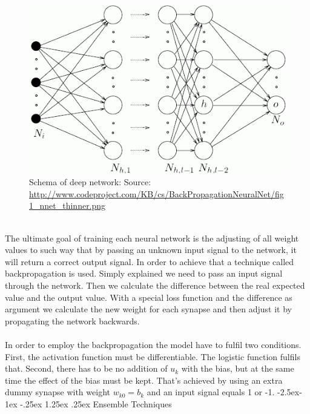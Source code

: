\documentclass[runningheads,a4paper]{llncs}[2015/06/24]
\makeatletter
\renewcommand\paragraph{\@startsection{paragraph}{4}{\z@}%
            {-2.5ex\@plus -1ex \@minus -.25ex}%
            {1.25ex \@plus .25ex}%
            {\normalfont\normalsize\bfseries}}
\makeatother
\begin{document}
\begin{figure}[h]
\centering
\includegraphics[width=\textwidth]{deepNetwork}
\caption{Schema of deep network: Source: \url{http://www.codeproject.com/KB/cs/BackPropagationNeuralNet/fig1_nnet_thinner.png}}
\label{fig:deepNetwork}
\end{figure}  
  
\hspace{1cm}\\ The ultimate goal of training each neural network is the adjusting of all weight values to such way that by passing an unknown input signal to the network, it will return a correct output signal. In order to achieve that a technique called backpropagation is used. Simply explained we need to pass an input signal through the network. Then we calculate the difference between the real expected value and the output value. With a special loss function and the difference as argument we calculate the new weight for each synapse and then adjust it by propagating the network backwards\cite{rumelhart1986learning}.\\\\ In order to employ the backpropagation the model have to fulfil two conditions. First, the activation function must be differentiable. The logistic function fulfils that. Second, there has to be no addition of $u_k$ with the bias, but at the same time the effect of the bias must be kept. That's achieved by using an extra dummy synapse with weight $w_{k0} = b_k$ and an input signal equals 1 or -1\cite{haykin2009neural}.
		 \paragraph{Ensemble Techniques}
\end{document}
